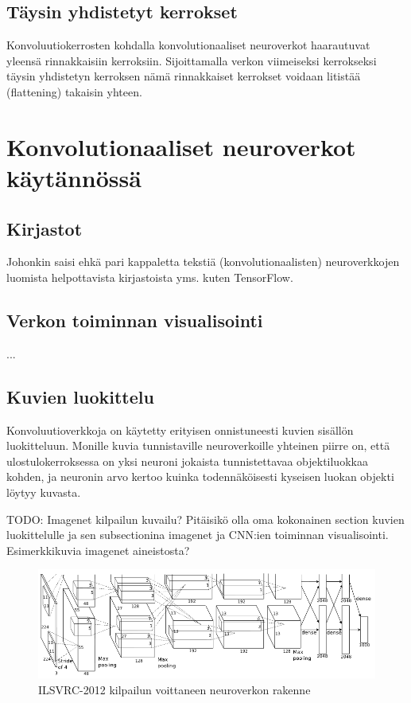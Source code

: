 \documentclass[finnish]{tktltiki2}
\theoremstyle{definition}
\theoremstyle{remark}
\begin{document}
    \subsection{Täysin yhdistetyt kerrokset}
    Konvoluutiokerrosten kohdalla konvolutionaaliset neuroverkot haarautuvat yleensä rinnakkaisiin kerroksiin. Sijoittamalla verkon viimeiseksi kerrokseksi täysin yhdistetyn kerroksen nämä rinnakkaiset kerrokset voidaan litistää (flattening) takaisin yhteen.

  \section{Konvolutionaaliset neuroverkot käytännössä}

    \subsection{Kirjastot}
    Johonkin saisi ehkä pari kappaletta tekstiä (konvolutionaalisten) neuroverkkojen luomista helpottavista kirjastoista yms. kuten TensorFlow.
    
  \subsection{Verkon toiminnan visualisointi}
  ... \cite{visualizing-convolutional}

  \subsection{Kuvien luokittelu}
    Konvoluutioverkkoja on käytetty erityisen onnistuneesti kuvien sisällön luokitteluun. Monille kuvia tunnistaville neuroverkoille yhteinen piirre on, että ulostulokerroksessa on yksi neuroni jokaista tunnistettavaa objektiluokkaa kohden, ja neuronin arvo kertoo kuinka todennäköisesti kyseisen luokan objekti löytyy kuvasta.


    TODO: Imagenet kilpailun kuvailu? Pitäisikö olla oma kokonainen section kuvien luokittelulle ja sen subsectionina imagenet ja CNN:ien toiminnan visualisointi. Esimerkkikuvia imagenet aineistosta?

    \begin{figure}[h]
    \centering
    \includegraphics[scale=0.4]{imagenet}
    \caption{ILSVRC-2012 kilpailun voittaneen neuroverkon rakenne \cite{KSHimagenet2012}}
    \label{pic:hsk-neuralnet}
    \end{figure}
\end{document}
